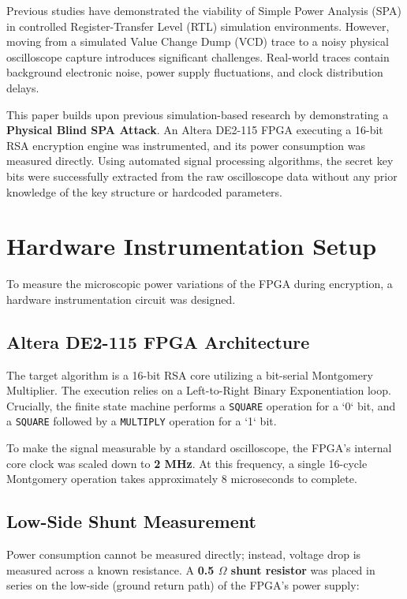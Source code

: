 \documentclass[conference, a4paper]{IEEEtran}
\begin{document}
Previous studies have demonstrated the viability of Simple Power Analysis (SPA) in controlled Register-Transfer Level (RTL) simulation environments. However, moving from a simulated Value Change Dump (VCD) trace to a noisy physical oscilloscope capture introduces significant challenges. Real-world traces contain background electronic noise, power supply fluctuations, and clock distribution delays.

This paper builds upon previous simulation-based research by demonstrating a \textbf{Physical Blind SPA Attack}. An Altera DE2-115 FPGA executing a 16-bit RSA encryption engine was instrumented, and its power consumption was measured directly. Using automated signal processing algorithms, the secret key bits were successfully extracted from the raw oscilloscope data without any prior knowledge of the key structure or hardcoded parameters.

\section{Hardware Instrumentation Setup}

To measure the microscopic power variations of the FPGA during encryption, a hardware instrumentation circuit was designed.

\subsection{Altera DE2-115 FPGA Architecture}
The target algorithm is a 16-bit RSA core utilizing a bit-serial Montgomery Multiplier. The execution relies on a Left-to-Right Binary Exponentiation loop. Crucially, the finite state machine performs a \texttt{SQUARE} operation for a `0` bit, and a \texttt{SQUARE} followed by a \texttt{MULTIPLY} operation for a `1` bit.

To make the signal measurable by a standard oscilloscope, the FPGA's internal core clock was scaled down to \textbf{2 MHz}. At this frequency, a single 16-cycle Montgomery operation takes approximately 8 microseconds to complete. 

\subsection{Low-Side Shunt Measurement}
Power consumption cannot be measured directly; instead, voltage drop is measured across a known resistance. A \textbf{0.5 $\Omega$ shunt resistor} was placed in series on the low-side (ground return path) of the FPGA's power supply:
\end{document}
